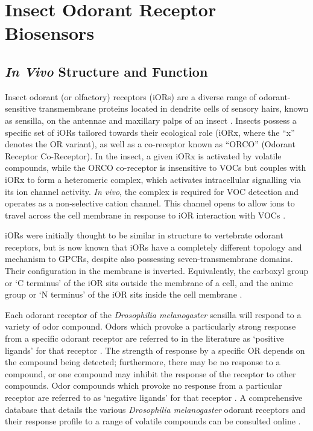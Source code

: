 \documentclass[
  a4paper,
]{scrbook}
\begin{document}
\hypertarget{insect-odorant-receptor-biosensors}{%
\section{Insect Odorant Receptor
Biosensors}\label{insect-odorant-receptor-biosensors}}

\hypertarget{in-vivo-structure-and-function-1}{%
\subsection{\texorpdfstring{\emph{In Vivo} Structure and
Function}{In Vivo Structure and Function}}\label{in-vivo-structure-and-function-1}}

Insect odorant (or olfactory) receptors (iORs) are a diverse range of
odorant-sensitive transmembrane proteins located in dendrite cells of
sensory hairs, known as sensilla, on the antennae and maxillary palps of
an insect \autocite{Clyne1999,Wicher2021}. Insects possess a specific
set of iORs tailored towards their ecological role (iORx, where the
``x'' denotes the OR variant), as well as a co-receptor known as
``ORCO'' (Odorant Receptor Co-Receptor). In the insect, a given iORx is
activated by volatile compounds, while the ORCO co-receptor is
insensitive to VOCs but couples with iORx to form a heteromeric complex,
which activates intracellular signalling via its ion channel activity.
\emph{In vivo}, the complex is required for VOC detection and operates
as a non-selective cation channel. This channel opens to allow ions to
travel across the cell membrane in response to iOR interaction with VOCs
\autocite{Smart2008,Wicher2008,Sato2008,Carraher2015,Butterwick2018,Wicher2021,Cheema2021}.

iORs were initially thought to be similar in structure to vertebrate
odorant receptors, but is now known that iORs have a completely
different topology and mechanism to GPCRs, despite also possessing
seven-transmembrane domains. Their configuration in the membrane is
inverted. Equivalently, the carboxyl group or `C terminus' of the iOR
sits outside the membrane of a cell, and the anime group or `N terminus'
of the iOR sits inside the cell membrane
\autocite{Glatz2011,Butterwick2018,Carraher2015}.

Each odorant receptor of the \emph{Drosophilia melanogaster} sensilla
will respond to a variety of odor compound. Odors which provoke a
particularly strong response from a specific odorant receptor are
referred to in the literature as `positive ligands' for that receptor
\autocite{Murugathas2019a,Murugathas2020}. The strength of response by a
specific OR depends on the compound being detected; furthermore, there
may be no response to a compound, or one compound may inhibit the
response of the receptor to other compounds. Odor compounds which
provoke no response from a particular receptor are referred to as
`negative ligands' for that receptor
\autocite{Murugathas2019a,Murugathas2020}. A comprehensive database that
details the various \emph{Drosophilia melanogaster} odorant receptors
and their response profile to a range of volatile compounds can be
consulted online \autocite{Munch2016}.
\end{document}
